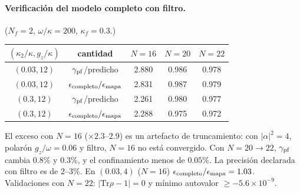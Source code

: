 \documentclass[11pt,a4paper]{article}
\theoremstyle{definition}
\begin{document}
\paragraph{Verificación del modelo completo con filtro.} ($N_f=2$, $\omega/\kappa=200$, $\kappa_f=0.3$.)
\begin{center}
\begin{tabular}{ccccc}
\toprule
$(\kappa_2/\kappa,g_z/\kappa)$ & cantidad & $N=16$ & $N=20$ & $N=22$\\
\midrule
$(0.03,12)$ & $\gamma_{\rm pf}$/predicho & 2.880 & 0.986 & 0.978\\
$(0.03,12)$ & $\epsilon_{\rm completo}/\epsilon_{\rm mapa}$ & 2.831 & 0.987 & 0.979\\
$(0.3,12)$ & $\gamma_{\rm pf}$/predicho & 2.261 & 0.980 & 0.977\\
$(0.3,12)$ & $\epsilon_{\rm completo}/\epsilon_{\rm mapa}$ & 2.288 & 0.975 & 0.972\\
\bottomrule
\end{tabular}
\end{center}
El exceso con $N=16$ ($\times2.3$--$2.9$) es un artefacto de truncamiento: con $|\alpha|^2=4$, polarón $g_z/\omega=0.06$ y filtro, $N=16$ no está convergido. Con $N=20\to22$, $\gamma_{\rm pf}$ cambia $0.8\%$ y $0.3\%$, y el confinamiento menos de $0.05\%$. La precisión declarada con filtro es de $2$--$3\%$. En $(0.03,4)$ ($N=16$) $\epsilon_{\rm completo}/\epsilon_{\rm mapa}=1.03$. Validaciones con $N=22$: $|\mathrm{Tr}\rho-1|=0$ y mínimo autovalor $\geq-5.6\times10^{-9}$.
\end{document}
